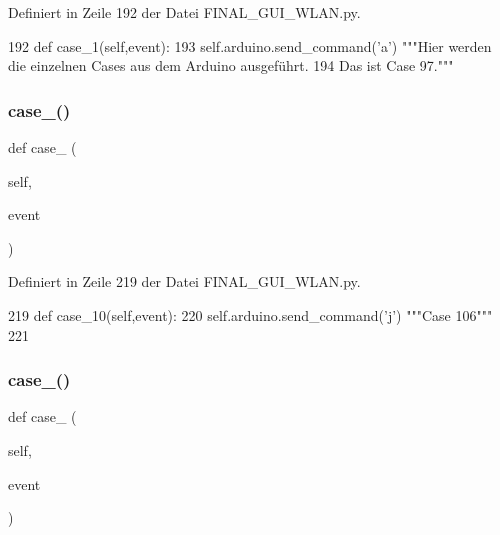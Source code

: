 Definiert in Zeile 192 der Datei F\+I\+N\+A\+L\+\_\+\+G\+U\+I\+\_\+\+W\+L\+A\+N.\+py.


\begin{DoxyCode}
192     \textcolor{keyword}{def }case\_1(self,event):
193         self.arduino.send\_command(\textcolor{stringliteral}{'a'})  \textcolor{stringliteral}{"""Hier werden die einzelnen Cases aus dem Arduino ausgeführt.}
194 \textcolor{stringliteral}{                                           Das ist Case 97."""}
\end{DoxyCode}
\mbox{\label{class_f_i_n_a_l___g_u_i___w_l_a_n_1_1_w_l_a_n_a32d18cb3cdd9763a6259b284e1f712f6}} 
\subsubsection{\texorpdfstring{case\+\_()}{case\_10()}}
{\footnotesize\ttfamily def case\+\_ (\begin{DoxyParamCaption}\item[{}]{self,  }\item[{}]{event }\end{DoxyParamCaption})}



Definiert in Zeile 219 der Datei F\+I\+N\+A\+L\+\_\+\+G\+U\+I\+\_\+\+W\+L\+A\+N.\+py.


\begin{DoxyCode}
219     \textcolor{keyword}{def }case\_10(self,event):
220         self.arduino.send\_command(\textcolor{stringliteral}{'j'})  \textcolor{stringliteral}{"""Case 106"""}
221     
\end{DoxyCode}
\mbox{\label{class_f_i_n_a_l___g_u_i___w_l_a_n_1_1_w_l_a_n_ab319a20d08a9c0885566a7fc381db73a}} 
\subsubsection{\texorpdfstring{case\+\_()}{case\_2()}}
{\footnotesize\ttfamily def case\+\_ (\begin{DoxyParamCaption}\item[{}]{self,  }\item[{}]{event }\end{DoxyParamCaption})}



